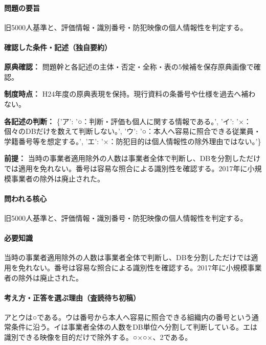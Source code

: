 \paragraph{問題の要旨} 旧5000人基準と、評価情報・識別番号・防犯映像の個人情報性を判定する。

\paragraph{確認した条件・記述（独自要約）}\mbox{}\par

\noindent\textbf{原典確認：} 問題幹と各記述の主体・否定・全称・表の5候補を保存原典画像で確認。\par

\noindent\textbf{制度時点：} H24年度の原典表現を保持。現行資料の条番号や仕様を過去へ補わない。\par

\noindent\textbf{各記述の判断：} \{'ア': '○：判断・評価も個人に関する情報である。', 'イ': '×：個々のDBだけを数えて判断しない。', 'ウ': '○：本人へ容易に照合できる従業員・学籍番号等を想定する。', 'エ': '×：防犯目的は個人情報性の除外理由ではない。'\}\par

\noindent\textbf{前提：} 当時の事業者適用除外の人数は事業者全体で判断し、DBを分割しただけでは適用を免れない。番号は容易な照合による識別性を確認する。2017年に小規模事業者の除外は廃止された。\par

\paragraph{問われる核心} 旧5000人基準と、評価情報・識別番号・防犯映像の個人情報性を判定する。

\paragraph{必要知識} 当時の事業者適用除外の人数は事業者全体で判断し、DBを分割しただけでは適用を免れない。番号は容易な照合による識別性を確認する。2017年に小規模事業者の除外は廃止された。

\paragraph{考え方・正答を選ぶ理由（査読待ち初稿）} アとウは○である。ウは番号から本人へ容易に照合できる組織内の番号という通常条件に沿う。イは事業者全体の人数をDB単位へ分割して判断している。エは識別できる映像を目的だけで除外する。○×○×、2である。

